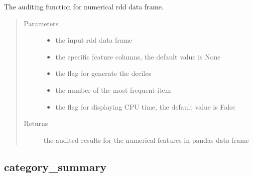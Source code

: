 \documentclass[letterpaper,12pt,english]{sphinxmanual}
\begin{document}
\begin{fulllineitems}
The auditing function for numerical rdd data frame.
\begin{quote}\begin{description}
\item[{Parameters}] \leavevmode\begin{itemize}
\item {} 
 \textendash{} the input rdd data frame

\item {} 
 \textendash{} the specific feature columns, the default value is None

\item {} 
 \textendash{} the flag for generate the deciles

\item {} 
 \textendash{} the number of the most frequent item

\item {} 
 \textendash{} the flag for displaying CPU time, the default value is False

\end{itemize}

\item[{Returns}] \leavevmode
the audited results for the numerical features in pandas data frame

\end{description}\end{quote}

\end{fulllineitems}



\subsection{category\_summary}
\label{\detokenize{basics:category-summary}}
\end{document}
